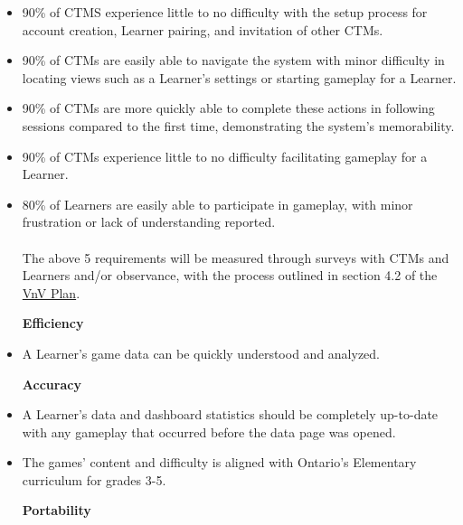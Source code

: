 \documentclass[12pt]{article}
\newcounter{nfrnum} %
\begin{document}
\begin{itemize}
  \setcounter{nfrnum}{0}
  \item[\refstepcounter{nfrnum}\thenfrnum \label{NFR-USE-1}:] 90\% of CTMS experience little to no difficulty with the setup process for account creation, Learner pairing, and invitation of other CTMs.
  \item[\refstepcounter{nfrnum}\thenfrnum \label{NFR-USE-2}:] 90\% of CTMs are easily able to navigate the system with minor difficulty in locating views such as a Learner's settings or starting gameplay for a Learner.
  \item[\refstepcounter{nfrnum}\thenfrnum \label{NFR-USE-3}:] 90\% of CTMs are more quickly able to complete these actions in following sessions compared to the first time, demonstrating the system's memorability.
  \item[\refstepcounter{nfrnum}\thenfrnum \label{NFR-USE-4}:] 90\% of CTMs experience little to no difficulty facilitating gameplay for a Learner.
  \item[\refstepcounter{nfrnum}\thenfrnum \label{NFR-USE-5}:] 80\% of Learners are easily able to participate in gameplay, with minor frustration or lack of understanding reported.
  \\\\
  The above 5 requirements will be measured through surveys with CTMs and Learners and/or observance, with the process outlined in section 4.2 of the \href{../../pdfs/VnVPlan/VnVPlan.pdf}{VnV Plan}.
  
  \textbf{Efficiency}
  
  \setcounter{nfrnum}{0}
  \item[\refstepcounter{nfrnum}\thenfrnum \label{NFR-EFF-1}:] A Learner's game data can be quickly understood and analyzed.
  
  \textbf{Accuracy}

  \setcounter{nfrnum}{0}
  \item[\refstepcounter{nfrnum}\thenfrnum \label{NFR-ACCU-1}:] A Learner's data and dashboard statistics should be completely up-to-date with any gameplay that occurred before the data page was opened.
  \item[\refstepcounter{nfrnum}\thenfrnum \label{NFR-ACCU-2}:] The games' content and difficulty is aligned with Ontario's Elementary curriculum for grades 3-5.
  
  \textbf{Portability}


\end{itemize}
\end{document}
